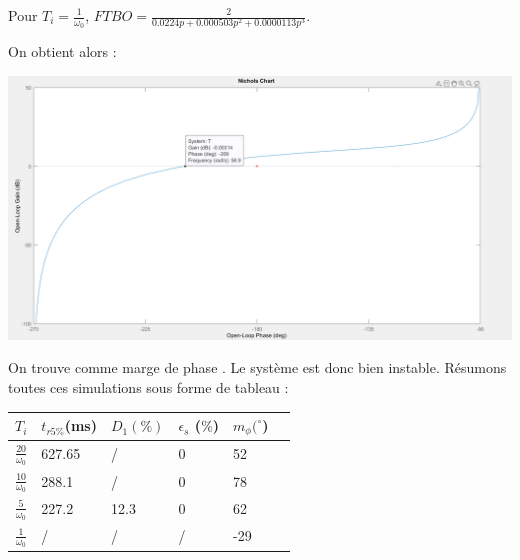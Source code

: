 \documentclass[12pt]{article}
\begin{document}
\begin{center}
    \normalsize Pour $T_i = \frac{1}{\omega_0}$, \large $FTBO = \frac{2}{0.0224p + 0.000503p^2 + 0.0000113p^3}$.
\end{center}
\normalsize On obtient alors :
\begin{center}
    \includegraphics[width = 16 cm]{TP2 Simulink/Syst_2/nichols_4.2_Ti=1_sur_omega0.png}
\end{center}
On trouve comme marge de phase . Le système est donc bien instable.
\newpage
Résumons toutes ces simulations sous forme de tableau : 
\begin{center}
    \begin{tabular}{ |p{1cm}|p{2.5cm}|p{2.5cm}|p{2.5cm}|p{2.5cm}|p{2.5cm}|}

        \hline
        $T_i$ & $t_{r5\%}$(ms) &$D_1 (\%)$ & $\epsilon_s$ ($\%$)&$m_{\phi} (^{\circ}$)\\
        \hline
        $\frac{20}{\omega_0}$& 627.65 & / & 0 & 52\\
        $\frac{10}{\omega_0}$ & 288.1 & / & 0 & 78  \\
        $\frac{5}{\omega_0}$ & 227.2 & 12.3 & 0 & 62  \\
        $\frac{1}{\omega_0}$ & / & / & / & -29  \\
        \hline
        \end{tabular}
    \end{center}
\end{document}
